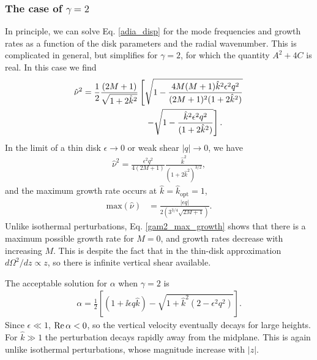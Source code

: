 \subsubsection{The case of $\gamma=2$}
In principle, we can solve Eq. \ref{adia_disp} for the mode
frequencies and growth rates as a function of the disk parameters and
the radial wavenumber. This is complicated in 
general, but simplifies for $\gamma=2$, for which the quantity
$A^2+4C$ is real. In this case we find
\begin{align}
  \hat{\nu}^2 =
  \frac{1}{2}\frac{(2M+1)}{\sqrt{1+2\hat{k}^2}}&\left[
    \sqrt{1-\frac{4M(M+1)\hat{k}^2\epsilon^2q^2}{(2M+1)^2(1+2\hat{k}^2)}}\right.\notag\\
  &\phantom{=}
  \left.- \sqrt{1 - \frac{\hat{k}^2\epsilon^2q^2}{(1+2\hat{k}^2)}}\right].
\end{align}
In the limit of a thin disk $\epsilon\to0$ or weak shear $|q|\to0$, we
have 
\begin{align}
  \hat{\nu}^2 = \frac{\epsilon^2
    q^2}{4(2M+1)}\frac{\hat{k}^2}{(1+2\hat{k}^2)^{3/2}},\label{gam2_growth}
\end{align}
and the maximum growth rate occurs at $\hat{k}=\hat{k}_\mathrm{opt}=1$,  
\begin{align}
  \mathrm{max}(\hat{\nu}) &= \frac{|\epsilon
    q|}{2(3^{3/4}\sqrt{2M+1})}\label{gam2_max_growth}.
\end{align}
Unlike isothermal perturbations, Eq. \ref{gam2_max_growth} shows that
there is a maximum possible growth rate for $M=0$, and growth rates decrease with increasing $M$. This
is despite the fact that in the thin-disk approximation 
$d\Omega^2/dz\propto z$, so there is infinite vertical shear
available.     

The acceptable solution for $\alpha$ when $\gamma=2$ is
\begin{align}
  \alpha = \frac{1}{2}\left[\left(1+\ii\epsilon q \hat{k}\right) -
    \sqrt{1 + \hat{k}^2\left(2-\epsilon^2 q^2\right)}\right].\label{gam2_alpha}
\end{align}
Since $\epsilon\ll 1$, $\operatorname{Re}\alpha<0$, so the vertical velocity
eventually decays for large heights. For $\hat{k}\gg 1$ the
perturbation decays rapidly away from the midplane. This is again
unlike isothermal perturbations, whose magnitude increase with $|z|$.  


